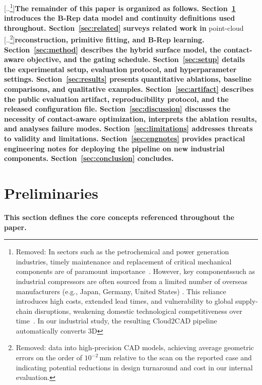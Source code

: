 \documentclass{ieeeaccess}
\providecommand{\DIFaddtex}[1]{{\color{blue}\bfseries #1}} %
\providecommand{\DIFdeltex}[1]{{\color{red}[..\footnote{\color{black}Removed: #1}]}} %
\providecommand{\DIFaddbegin}{} %
\providecommand{\DIFaddend}{} %
\providecommand{\DIFdelbegin}{} %
\providecommand{\DIFdelend}{} %
\providecommand{\DIFadd}[1]{\texorpdfstring{\DIFaddtex{#1}}{#1}} %
\providecommand{\DIFdel}[1]{\texorpdfstring{\DIFdeltex{#1}}{}} %
\begin{document}
\DIFdelbegin \DIFdel{In sectors such as the petrochemical and power generation industries, timely maintenance and replacement of critical mechanical components are of paramount importance~\cite{b16,b25}.
However, key componentssuch as industrial compressors are often sourced from a limited number of overseas manufacturers (e.g., Japan, Germany, United States)
. This reliance introduces high costs, extended lead times, and vulnerability to global supply-chain disruptions, weakening domestic technological competitiveness over time~\cite{b16}.
In our industrial study, the resulting Cloud2CAD pipeline automatically converts 3D }\DIFdelend \DIFaddbegin \DIFadd{The remainder of this paper is organized as follows.
Section~\ref{sec:prelim} introduces the B-Rep data model and continuity definitions used throughout.
Section~\ref{sec:related} surveys related work in }\DIFaddend point-cloud \DIFdelbegin \DIFdel{data into high-precision CAD models, achieving average geometric errors on the order of $10^{-2}$\,mm relative to the scan on the reported case and indicating potential reductions in design turnaround and cost in our internal evaluation.
}\DIFdelend \DIFaddbegin \DIFadd{reconstruction, primitive fitting, and B-Rep learning.
Section~\ref{sec:method} describes the hybrid surface model, the contact-aware objective, and the gating schedule.
Section~\ref{sec:setup} details the experimental setup, evaluation protocol, and hyperparameter settings.
Section~\ref{sec:results} presents quantitative ablations, baseline comparisons, and qualitative examples.
Section~\ref{sec:artifact} describes the public evaluation artifact, reproducibility protocol, and the released configuration file.
Section~\ref{sec:discussion} discusses the necessity of contact-aware optimization, interprets the ablation results, and analyses failure modes.
Section~\ref{sec:limitations} addresses threats to validity and limitations.
Section~\ref{sec:engnotes} provides practical engineering notes for deploying the pipeline on new industrial components.
Section~\ref{sec:conclusion} concludes.
}\DIFaddend 


\DIFaddbegin \section{\DIFadd{Preliminaries}}
\label{sec:prelim}

\DIFadd{This section defines the core concepts referenced throughout the paper.
}
\end{document}
